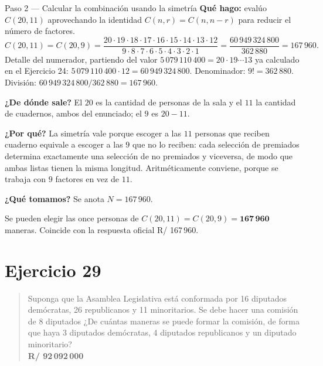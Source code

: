 \documentclass[11pt]{article}
\begin{document}
\begin{paso}{Paso 2 --- Calcular la combinación usando la simetría}
\textbf{Qué hago:} evalúo $C(20,11)$ aprovechando la identidad $C(n,r)=C(n,n-r)$ para reducir el número de factores.
\[
  C(20,11)=C(20,9)=\frac{20\cdot 19\cdot 18\cdot 17\cdot 16\cdot 15\cdot 14\cdot 13\cdot 12}{9\cdot 8\cdot 7\cdot 6\cdot 5\cdot 4\cdot 3\cdot 2\cdot 1}
  =\frac{60\,949\,324\,800}{362\,880}=167\,960 .
\]
Detalle del numerador, partiendo del valor $5\,079\,110\,400=20\cdot 19\cdots 13$ ya calculado en el Ejercicio 24: $5\,079\,110\,400\cdot 12 = 60\,949\,324\,800$. Denominador: $9!=362\,880$. División: $60\,949\,324\,800/362\,880=167\,960$.

\textbf{¿De dónde sale?} El $20$ es la cantidad de personas de la sala y el $11$ la cantidad de cuadernos, ambos del enunciado; el $9$ es $20-11$.

\textbf{¿Por qué?} La simetría vale porque escoger a las $11$ personas que reciben cuaderno equivale a escoger a las $9$ que no lo reciben: cada selección de premiados determina exactamente una selección de no premiados y viceversa, de modo que ambas listas tienen la misma longitud. Aritméticamente conviene, porque se trabaja con $9$ factores en vez de $11$.

\textbf{¿Qué tomamos?} Se anota $N=167\,960$.
\end{paso}

\begin{resp}
Se pueden elegir las once personas de $C(20,11)=C(20,9)=\mathbf{167\,960}$ maneras. Coincide con la respuesta oficial R/ 167\,960.
\end{resp}

\section*{Ejercicio 29}

\begin{quote}
Suponga que la Asamblea Legislativa está conformada por 16 diputados demócratas, 26 republicanos y 11 minoritarios. Se debe hacer una comisión de 8 diputados ¿De cuántas maneras se puede formar la comisión, de forma que haya 3 diputados demócratas, 4 diputados republicanos y un diputado minoritario?\\[2pt]
\textbf{R/ 92\,092\,000}
\end{quote}
\end{document}
